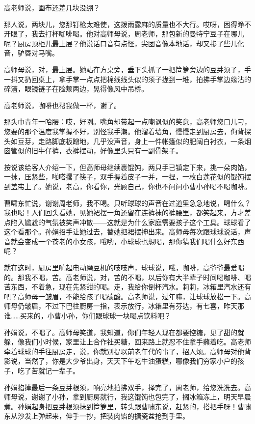 \documentclass[lang=cn,newtx,12pt,scheme=chinese]{elegantbook}
\begin{document}
高老师说，画布还差几块没绷？

那人说，两块儿，您那钉枪太难使，这拨雨露麻的质量也不大行。哎呀，困得睁不开眼了，我去打杯咖啡喝。他对高师母说，周老师，那包新的曼特宁豆子在哪儿呢？厨房顶柜儿最上层？他说话口音有点怪，尖团音像本地话，却又掺了些儿化音，驴唇对马嘴。

高师母说，对，最上层。她站在方桌旁，垂下头抓了一把笸箩旁边的豆芽须子，手一抖又扔回桌上，拿手掌一点点把棉线线头似的须子拢到一堆，拍拂手掌边缘沾的碎渣，眼镜链子在脸颊两边，晃得像风中吊桥。

高老师说，咖啡也帮我做一杯，谢了。

那头巾青年一哈腰：哎，好咧。嘴角却带起一点嘲讽似的笑意，高老师您口儿刁，您要的那个温度我掌握不好，别怪我手潮。他溜着墙角，慢慢走到厨房去，佝背探头如豆芽，走路脚底板蹭地，几乎没声音，身上一件帐篷似的肥阔白衬衣，一条烟囱管似的旧牛仔裤，衣裤摆动，好像里头只有一副骨架子。

按说该给客人介绍一下，但高师母继续裹馄饨，两只手已镇定下来，挑一朵肉馅，一抹，压紧些，啪嗒撂了筷子，双手握着皮子一并，一捏，一枚白莲花似的馄饨摆到盖帘上了。她说，老高，你看你，光顾自己，你也不问问小曹小孙喝不喝咖啡。

曹啸东忙说，谢谢周老师，我不喝。只听球球的声音在过道里急急地说，喝什么？我也喝！人们回头看她，见她裙摆一角还留在连裤袜的裤腰里，都笑起来，方才差点陷入尴尬的气氛被笑声冲散——这就是为什么家庭需要孩子这个工具。球球看了这个看那个。孙娟招手让她过去，替她把裙摆抻出来。高师母每次跟球球说话，声音就会变成一个苍老的小女孩，哦哟，小球球也想喝，那你猜我们喝什么好东西呢？

就在这时，厨房里响起电动磨豆机的吱吱声，球球说，哦，咖啡，高爷爷最爱喝的。那我不喝，苦。高老师说，对，苦的不喝，以后你有大半辈子时间喝咖啡、喝苦东西，不着急，现在先紧甜的喝。走，我给你倒杯汽水。莉莉，冰箱里汽水还有吧？高师母一皱眉，不能给孩子喝碳酸。高老师说，过年嘛，让球球放松一下。高师母仍皱眉，不过下巴往厨房一指，表示放行，冰箱里有芬达，有七喜，昨天那谁……买来的，小曹小孙，你们跟球球一块喝点饮料吧？

孙娟说，不喝了。高师母笑道，我知道，你们年轻人现在都要控糖，见了甜的就躲，像我们小时候，家里让上合作社买糖，回来路上就忍不住拿手蘸着吃。高老师牵着球球的手往厨房走，说，你就别提以前老年代的事了，招人烦。高师母对他背影说，当然了，你是大少爷出身，天天下午吃牛油蛋糕，哪像我们穷家小户的孩子，吃了苦就记一辈子。

孙娟掐掉最后一条豆芽根须，响亮地拍拂双手，择完了，周老师，给您洗洗去。高师母说，谢谢了小孙，拿到厨房就行，我这馄饨也包完了，搁冰箱冻上，明天早晨煮。孙娟起身把豆芽根须抹到笸箩里，转头跟曹啸东说，赶紧的，搭把手呀！曹啸东从沙发上弹起来，伸手一抄，把装肉馅的搪瓷盆抢到手里。
\end{document}
